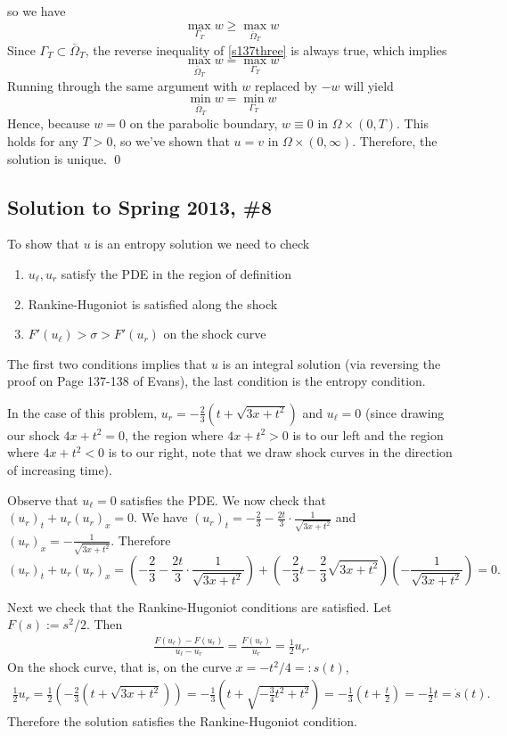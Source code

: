 so we have
\begin{equation}
\label{s137three}
	\max_{\Gamma_T} w \geq \max_{\bar{\Omega}_T} w
\end{equation}
Since $\Gamma_T \subset \bar{\Omega}_T$, the reverse inequality of \eqref{s137three} is always true, which implies
$$ \max_{\bar{\Omega}_T} w = \max_{\Gamma_T} w $$
Running through the same argument with $w$ replaced by $-w$ will yield
$$ \min_{\bar{\Omega}_T} w = \min_{\Gamma_T} w $$
Hence, because $w = 0$ on the parabolic boundary, $w \equiv 0$ in $\Omega \times (0,T)$. This holds for any $T > 0$, so we've shown that $u=v$ in $\Omega \times (0,\infty)$. Therefore, the solution is unique. \qed

\subsection*{Solution to Spring 2013, \#8}\label{s138}
To show that $u$ is an entropy solution we need to check
\begin{enumerate}
\item $u_{\ell}, u_{r}$ satisfy the PDE in the region of definition
\item Rankine-Hugoniot is satisfied along the shock
\item $F'(u_{\ell}) > \sigma > F'(u_{r})$ on the shock curve
\end{enumerate}
The first two conditions implies that $u$ is an integral solution (via reversing the proof on Page 137-138 of Evans), the last condition is the entropy condition.

In the case of this problem, $u_{r} = -\frac{2}{3}(t + \sqrt{3x + t^{2}})$ and $u_{\ell} = 0$ (since drawing our shock $4x + t^{2} = 0$,
the region where $4x + t^{2} > 0$ is to our left and the region where $4x + t^{2} < 0$ is to our right, note that we draw shock curves in the direction of increasing time).

Observe that $u_{\ell} = 0$ satisfies the PDE. We now check that $(u_{r})_{t} + u_{r}(u_{r})_{x} = 0$. We have
$(u_{r})_{t} = -\frac{2}{3} - \frac{2t}{3}\cdot \frac{1}{\sqrt{3x + t^{2}}}$ and $(u_{r})_{x} = -\frac{1}{\sqrt{3x + t^{2}}}$.
Therefore
$$(u_{r})_{t} + u_{r}(u_{r})_{x} = (-\frac{2}{3} - \frac{2t}{3}\cdot \frac{1}{\sqrt{3x + t^{2}}}) + (-\frac{2}{3}t - \frac{2}{3}\sqrt{3x + t^{2}})(-\frac{1}{\sqrt{3x + t^{2}}}) = 0.$$

Next we check that the Rankine-Hugoniot conditions are satisfied. Let $F(s) := s^{2}/2$. Then
\begin{align*}
\frac{F(u_{\ell}) - F(u_{r})}{u_{\ell} - u_{r}} = \frac{F(u_{r})}{u_{r}} = \frac{1}{2}u_{r}.
\end{align*}
On the shock curve, that is, on the curve $x = -t^{2}/4 =: s(t)$,
\begin{align*}
\frac{1}{2}u_{r} = \frac{1}{2}(-\frac{2}{3}(t + \sqrt{3x + t^{2}})) = -\frac{1}{3}(t + \sqrt{-\frac{3}{4}t^{2} + t^{2}}) = -\frac{1}{3}(t + \frac{t}{2}) = -\frac{1}{2}t = \dot{s}(t).
\end{align*}
Therefore the solution satisfies the Rankine-Hugoniot condition.

